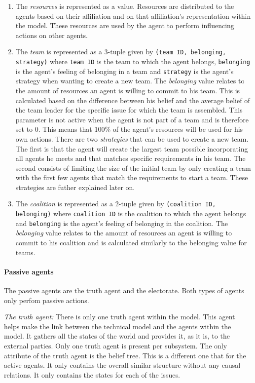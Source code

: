\begin{enumerate}
\item The \emph{resources} is represented as a value. Resources are distributed to the agents based on their affiliation and on that affiliation's representation within the model. These resources are used by the agent to perform influencing actions on other agents.

\item The \emph{team} is represented as a 3-tuple given by \texttt{(team ID, belonging, strategy)} where \texttt{team ID} is the team to which the agent belongs, \texttt{belonging} is the agent’s feeling of belonging in a team and \texttt{strategy} is the agent's strategy when wanting to create a new team. The \emph{belonging} value relates to the amount of resources an agent is willing to commit to his team. This is calculated based on the difference between his belief and the average belief of the team leader for the specific issue for which the team is assembled. This parameter is not active when the agent is not part of a team and is therefore set to 0. This means that 100\% of the agent’s resources will be used for his own actions. There are two \emph{strategies} that can be used to create a new team. The first is that the agent will create the largest team possible incorporating all agents he meets and that matches specific requirements in his team. The second consists of limiting the size of the initial team by only creating a team with the first few agents that match the requirements to start a team. These strategies are futher explained later on.

\item The \emph{coalition} is represented as a 2-tuple given by \texttt{(coalition ID, belonging)} where \texttt{coalition ID} is the coalition to which the agent belongs and \texttt{belonging} is the agent’s feeling of belonging in the coalition. The \emph{belonging} value relates to the amount of resources an agent is willing to commit to his coalition and is calculated similarly to the belonging value for teams.

\end{enumerate}

\paragraph{Passive agents}

The passive agents are the truth agent and the electorate. Both types of agents only perfom passive actions.

\emph{The truth agent: } There is only one truth agent within the model. This agent helps make the link between the technical model and the agents within the model. It gathers all the states of the world and provides it, as it is, to the external parties. Only one truth agent is present per subsystem. The only attribute of the truth agent is the belief tree. This is a different one that for the active agents. It only contains the overall similar structure without any causal relations. It only contains the states for each of the issues.


